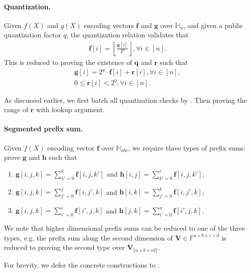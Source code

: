 \paragraph{Quantization.}
Given $f(X)$ and $g(X)$ encoding vectors $\mathbf{f}$ and $\mathbf{g}$ over $\mathbb{H}_n$,
    and given a public quantization factor $q$,
    the quantization relation validates that
    \begin{align}
        \mathbf{f}[i] = \left\lfloor \frac{\mathbf{g}[i]}{2^q} \right\rfloor, \forall i\in [n].
    \end{align}
    This is reduced to proving the existence of $\mathbf{q}$ and $\mathbf{r}$ such that
    \begin{align}
        \mathbf{g}[i] = 2^q \cdot \mathbf{f}[i] + \mathbf{r}[i], \forall i\in [n], \\
        0 \leq \mathbf{r}[i] < 2^q, \forall i\in [n].
    \end{align}

As discussed earlier, we first batch all quantization checks
    by .
    Then proving the range of $\mathbf{r}$ with lookup argument.

\paragraph{Segmented prefix sum.}
Given $f(X)$ encoding vector $\mathbf{f}$ over $\mathbb{H}_{abc}$,
    we require three types of prefix sums:
    prove $\mathbf{g}$ and $\mathbf{h}$ such that
    \begin{enumerate}
        \item $\mathbf{g}[i, j, k] = \sum_{k'=0}^{k} \mathbf{f}[i, j, k']$ and $\mathbf{h}[i, j] = \sum_{k'=0}^{c} \mathbf{f}[i, j, k']$;
        \item $\mathbf{g}[i, j, k] = \sum_{j'=0}^{j} \mathbf{f}[i, j', k]$ and $\mathbf{h}[i, k] = \sum_{j'=0}^{b} \mathbf{f}[i, j', k]$;
        \item $\mathbf{g}[i, j, k] = \sum_{i'=0}^{i} \mathbf{f}[i', j, k]$ and $\mathbf{h}[j, k] = \sum_{i'=0}^{a} \mathbf{f}[i', j, k]$.
    \end{enumerate}
    We note that higher dimensional prefix sums can be reduced to 
    one of the three types,
    e.g. the prefix sum along the second dimension of
    $\mathbf{V}\in \mathbb{F}^{a\times b\times c\times d}$
    is reduced to proving the second type over
    $\mathbf{V}_{\{a\times b\times cd\}}$.
    
For brevity, we defer the concrete constructions to .

